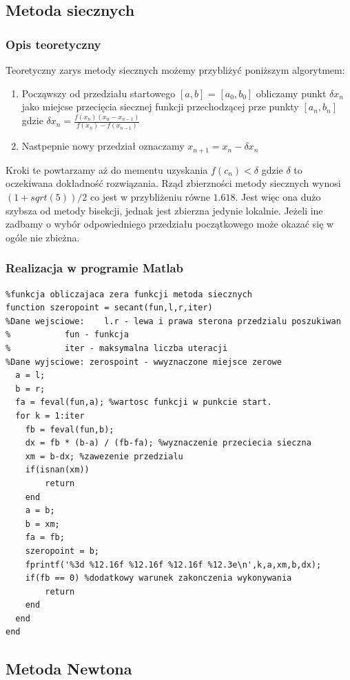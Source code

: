 \documentclass[a4paper, 11pt]{article}
\begin{document}
\subsection{Metoda siecznych}
\subsubsection{Opis teoretyczny}
Teoretyczny zarys metody siecznych możemy przybliżyć poniższym algorytmem:
\begin{enumerate}
  \item Począwszy od przedziału startowego $[a,b]$ = $[a_{0},b_{0}]$ obliczamy punkt $\delta x_{n}$ jako miejcse przecięcia siecznej funkcji przechodzącej prze punkty $[a_{n},b_{n}]$ gdzie $\delta x_{n}=\frac{f(x_{n})(x_{n}-x_{n-1})}{f(x_{n})-f(x_{n-1})}$
  \item Nastpepnie nowy przedział oznaczamy $x_{n+1}=x_{n}-\delta x_{n}$ 
\end{enumerate} 
Kroki te powtarzamy aż do mementu uzyskania $f(c_{n})<\delta$ gdzie $\delta$ to oczekiwana dokładność rozwiązania. Rząd zbierzności metody siecznych wynosi $(1+sqrt(5))/2$ co jest w przybliżeniu równe $1.618$. 
Jest więc ona dużo szybsza od metody bisekcji, jednak jest zbierzna jedynie lokalnie. Jeżeli ine zadbamy o wybór odpowiedniego przedziału początkowego może okazać się w ogóle nie zbieżna.


\subsubsection{Realizacja w programie Matlab}
\begin{lstlisting}
%funkcja obliczajaca zera funkcji metoda siecznych
function szeropoint = secant(fun,l,r,iter)
%Dane wejsciowe:	l.r - lewa i prawa sterona przedzialu poszukiwan
%			fun - funkcja 
%			iter - maksymalna liczba uteracji
%Dane wyjsciowe: zerospoint - wwyznaczone miejsce zerowe
  a = l;
  b = r;
  fa = feval(fun,a); %wartosc funkcji w punkcie start.
  for k = 1:iter
    fb = feval(fun,b);
    dx = fb * (b-a) / (fb-fa); %wyznaczenie przeciecia sieczna
    xm = b-dx; %zawezenie przedzialu
    if(isnan(xm))
        return
    end
    a = b;
    b = xm;
    fa = fb;
    szeropoint = b;
    fprintf('%3d %12.16f %12.16f %12.16f %12.3e\n',k,a,xm,b,dx);
    if(fb == 0) %dodatkowy warunek zakonczenia wykonywania
        return
    end
  end
end
\end{lstlisting}

\subsection{Metoda Newtona}
\end{document}
